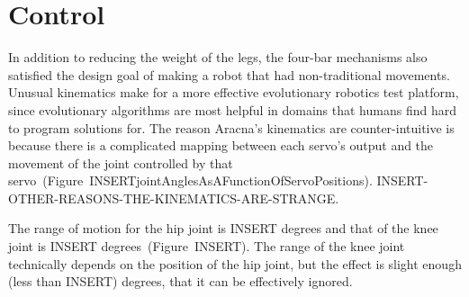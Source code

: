 \documentclass[letterpaper]{article}
\begin{document}



\begin{table}[h]
\vskip 0.25cm
\caption{Estimated total cost. The cost of components and printing material reflect market prices from March 2012. A complete parts list is on our website \citep{WEB}.}
\end{table}



\section{Control}

In addition to reducing the weight of the legs, the four-bar
mechanisms also satisfied the design goal of making a robot that had
non-traditional movements. Unusual kinematics make for a more effective evolutionary robotics test platform, since evolutionary algorithms are most helpful in domains that humans find hard to program solutions for. The reason Aracna's kinematics are counter-intuitive is because there is a complicated mapping between each servo's output and the movement of the joint controlled by that servo~(Figure~INSERTjointAnglesAsAFunctionOfServoPositions). INSERT-OTHER-REASONS-THE-KINEMATICS-ARE-STRANGE. 

The range of motion for the hip joint is INSERT degrees and that of the knee joint is INSERT degrees~(Figure~INSERT). The range of the knee joint technically depends on the position of the hip joint, but the effect is slight enough (less than INSERT) degrees, that it can be effectively ignored. 
\end{document}
